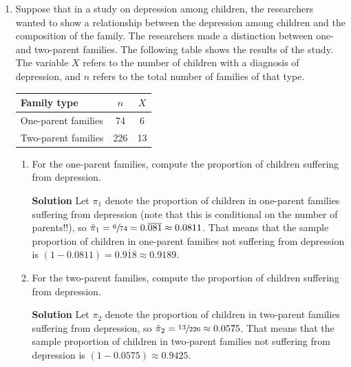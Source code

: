 \begin{enumerate}
    \item Suppose that in a study on depression among children, the researchers wanted to show a relationship between the depression among children and the composition of the family. The researchers made a distinction between one- and two-parent families. The following table shows the results of the study. The variable $X$ refers to the number of children with a diagnosis of depression, and $n$ refers to the total number of families of that type.
    \FloatBarrier
    \begin{table}[h]
    \centering
    \begin{tabular}{l|c|c}
    Family type & $n$ & $X$ \\ \hline
    One-parent families & 74 & 6 \\
    Two-parent families & 226 & 13
    \end{tabular}
    \end{table}
    \FloatBarrier
    \begin{enumerate}
        \item For the one-parent families, compute the proportion of children suffering from depression.
        \begin{framed}{\textbf{Solution}}
        Let $\pi_1$ denote the proportion of children in one-parent families suffering from depression (note that this is conditional on the number of parents!!), so $\hat{\pi}_1 = \sfrac{6}{74}=0.\overline{081}\approx 0.0811$. That means that the sample proportion of children in one-parent families not suffering from depression is $(1-0.0811) = 0.\overline{918}\approx 0.9189$.
        \end{framed}
        
        \item For the two-parent families, compute the proportion of children suffering from depression.
        \begin{framed}{\textbf{Solution}}
        Let $\pi_2$ denote the proportion of children in two-parent families suffering from depression, so $\hat{\pi}_2 = \sfrac{13}{226}\approx 0.0575$. That means that the sample proportion of children in two-parent families not suffering from depression is $(1-0.0575)\approx 0.9425$.
        \end{framed}
        

\end{enumerate}
\end{enumerate}
